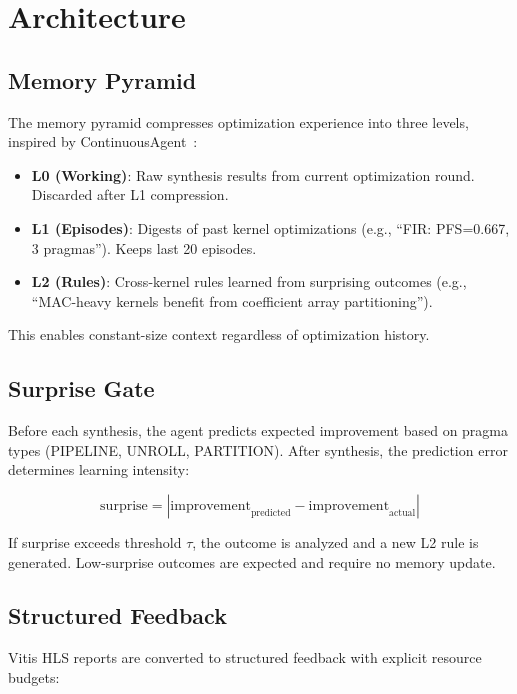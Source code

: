 \documentclass[conference]{IEEEtran}
\begin{document}
\section{Architecture}

\subsection{Memory Pyramid}

The memory pyramid compresses optimization experience into three
levels, inspired by ContinuousAgent~\cite{continuous}:

\begin{itemize}
    \item \textbf{L0 (Working)}: Raw synthesis results from current
    optimization round. Discarded after L1 compression.
    \item \textbf{L1 (Episodes)}: Digests of past kernel optimizations
    (e.g., ``FIR: PFS=0.667, 3 pragmas''). Keeps last 20 episodes.
    \item \textbf{L2 (Rules)}: Cross-kernel rules learned from
    surprising outcomes (e.g., ``MAC-heavy kernels benefit from
    coefficient array partitioning'').
\end{itemize}

This enables constant-size context regardless of optimization history.

\subsection{Surprise Gate}

Before each synthesis, the agent predicts expected improvement based
on pragma types (PIPELINE, UNROLL, PARTITION). After synthesis, the
prediction error determines learning intensity:

\begin{equation}
    \text{surprise} = |\text{improvement}_{\text{predicted}} -
    \text{improvement}_{\text{actual}}|
\end{equation}

If surprise exceeds threshold $\tau$, the outcome is analyzed and
a new L2 rule is generated. Low-surprise outcomes are expected and
require no memory update.

\subsection{Structured Feedback}

Vitis HLS reports are converted to structured feedback with explicit
resource budgets:
\end{document}
